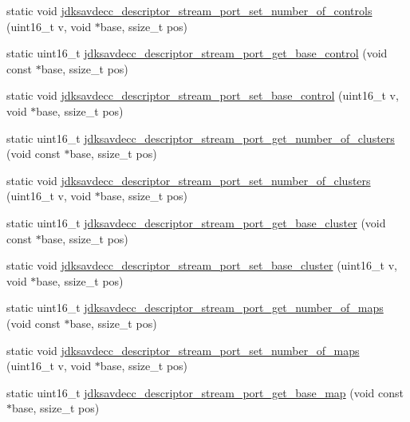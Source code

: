 \begin{DoxyCompactItemize}
\item 
static void \hyperlink{group__descriptor__stream__port_ga2f4b1d2229b6f1df9536517812d05a3f}{jdksavdecc\+\_\+descriptor\+\_\+stream\+\_\+port\+\_\+set\+\_\+number\+\_\+of\+\_\+controls} (uint16\+\_\+t v, void $\ast$base, ssize\+\_\+t pos)
\item 
static uint16\+\_\+t \hyperlink{group__descriptor__stream__port_ga75cb0d52e8f2b03cf7de1562dd1b98df}{jdksavdecc\+\_\+descriptor\+\_\+stream\+\_\+port\+\_\+get\+\_\+base\+\_\+control} (void const $\ast$base, ssize\+\_\+t pos)
\item 
static void \hyperlink{group__descriptor__stream__port_ga30717d11d426fe9e654e79db9507dff0}{jdksavdecc\+\_\+descriptor\+\_\+stream\+\_\+port\+\_\+set\+\_\+base\+\_\+control} (uint16\+\_\+t v, void $\ast$base, ssize\+\_\+t pos)
\item 
static uint16\+\_\+t \hyperlink{group__descriptor__stream__port_ga038db49f6e97689c7b549b6575c72593}{jdksavdecc\+\_\+descriptor\+\_\+stream\+\_\+port\+\_\+get\+\_\+number\+\_\+of\+\_\+clusters} (void const $\ast$base, ssize\+\_\+t pos)
\item 
static void \hyperlink{group__descriptor__stream__port_ga1a78e28b5b54e197fceaa0c78c3a15b8}{jdksavdecc\+\_\+descriptor\+\_\+stream\+\_\+port\+\_\+set\+\_\+number\+\_\+of\+\_\+clusters} (uint16\+\_\+t v, void $\ast$base, ssize\+\_\+t pos)
\item 
static uint16\+\_\+t \hyperlink{group__descriptor__stream__port_ga94d4d5b718a920fa018d2b0070fe5208}{jdksavdecc\+\_\+descriptor\+\_\+stream\+\_\+port\+\_\+get\+\_\+base\+\_\+cluster} (void const $\ast$base, ssize\+\_\+t pos)
\item 
static void \hyperlink{group__descriptor__stream__port_gae89f646edcaebd56089db2efb1a051e1}{jdksavdecc\+\_\+descriptor\+\_\+stream\+\_\+port\+\_\+set\+\_\+base\+\_\+cluster} (uint16\+\_\+t v, void $\ast$base, ssize\+\_\+t pos)
\item 
static uint16\+\_\+t \hyperlink{group__descriptor__stream__port_gaf9d286bd9ce8e7bcd8e0fc37d7a776ad}{jdksavdecc\+\_\+descriptor\+\_\+stream\+\_\+port\+\_\+get\+\_\+number\+\_\+of\+\_\+maps} (void const $\ast$base, ssize\+\_\+t pos)
\item 
static void \hyperlink{group__descriptor__stream__port_gac5bac21e6bf791df532f85f2ed3eaa6f}{jdksavdecc\+\_\+descriptor\+\_\+stream\+\_\+port\+\_\+set\+\_\+number\+\_\+of\+\_\+maps} (uint16\+\_\+t v, void $\ast$base, ssize\+\_\+t pos)
\item 
static uint16\+\_\+t \hyperlink{group__descriptor__stream__port_gacd1e6804280845a853725f6e38639380}{jdksavdecc\+\_\+descriptor\+\_\+stream\+\_\+port\+\_\+get\+\_\+base\+\_\+map} (void const $\ast$base, ssize\+\_\+t pos)

\end{DoxyCompactItemize}
